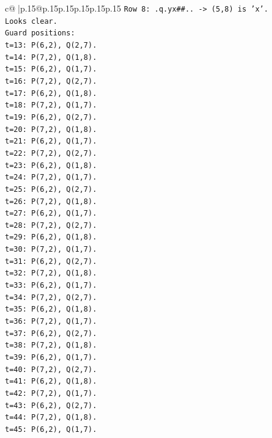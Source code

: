 \documentclass{article}
\begin{document}
{\begin{supertabular}{c@{$\;$}|p{.15\linewidth}@{}p{.15\linewidth}p{.15\linewidth}p{.15\linewidth}p{.15\linewidth}p{.15\linewidth}}
{{{\texttt{Row 8: .q.yx\#\#.. {-}> (5,8) is 'x'.} \\
\texttt{Looks clear.} \\
\texttt{Guard positions:} \\
\texttt{t=13: P(6,2), Q(2,7).} \\
\texttt{t=14: P(7,2), Q(1,8).} \\
\texttt{t=15: P(6,2), Q(1,7).} \\
\texttt{t=16: P(7,2), Q(2,7).} \\
\texttt{t=17: P(6,2), Q(1,8).} \\
\texttt{t=18: P(7,2), Q(1,7).} \\
\texttt{t=19: P(6,2), Q(2,7).} \\
\texttt{t=20: P(7,2), Q(1,8).} \\
\texttt{t=21: P(6,2), Q(1,7).} \\
\texttt{t=22: P(7,2), Q(2,7).} \\
\texttt{t=23: P(6,2), Q(1,8).} \\
\texttt{t=24: P(7,2), Q(1,7).} \\
\texttt{t=25: P(6,2), Q(2,7).} \\
\texttt{t=26: P(7,2), Q(1,8).} \\
\texttt{t=27: P(6,2), Q(1,7).} \\
\texttt{t=28: P(7,2), Q(2,7).} \\
\texttt{t=29: P(6,2), Q(1,8).} \\
\texttt{t=30: P(7,2), Q(1,7).} \\
\texttt{t=31: P(6,2), Q(2,7).} \\
\texttt{t=32: P(7,2), Q(1,8).} \\
\texttt{t=33: P(6,2), Q(1,7).} \\
\texttt{t=34: P(7,2), Q(2,7).} \\
\texttt{t=35: P(6,2), Q(1,8).} \\
\texttt{t=36: P(7,2), Q(1,7).} \\
\texttt{t=37: P(6,2), Q(2,7).} \\
\texttt{t=38: P(7,2), Q(1,8).} \\
\texttt{t=39: P(6,2), Q(1,7).} \\
\texttt{t=40: P(7,2), Q(2,7).} \\
\texttt{t=41: P(6,2), Q(1,8).} \\
\texttt{t=42: P(7,2), Q(1,7).} \\
\texttt{t=43: P(6,2), Q(2,7).} \\
\texttt{t=44: P(7,2), Q(1,8).} \\
\texttt{t=45: P(6,2), Q(1,7).} \\
}}}
\end{supertabular}}
\end{document}

